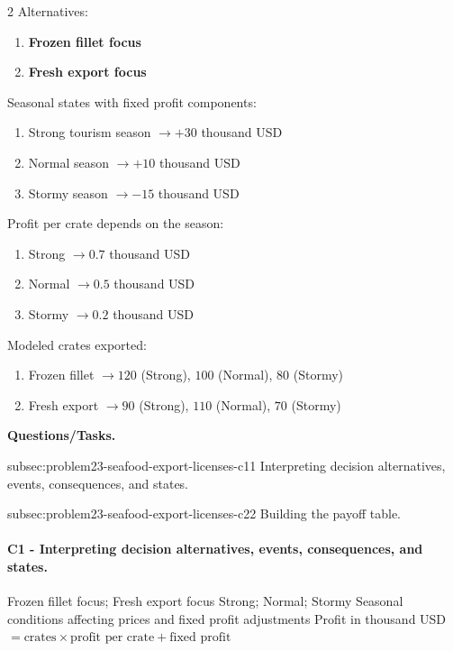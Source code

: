 	\begin{multicols}{2}
		Alternatives:
		\begin{enumerate}[label=\arabic*.]
			\item \textbf{Frozen fillet focus}
			\item \textbf{Fresh export focus}
		\end{enumerate}

		Seasonal states with fixed profit components:
		\begin{enumerate}[label=\arabic*.]
			\item Strong tourism season $\to +30$ thousand USD
			\item Normal season $\to +10$ thousand USD
			\item Stormy season $\to -15$ thousand USD
		\end{enumerate}

			\columnbreak

		Profit per crate depends on the season:
		\begin{enumerate}[label=\arabic*.]
			\item Strong $\to 0.7$ thousand USD
			\item Normal $\to 0.5$ thousand USD
			\item Stormy $\to 0.2$ thousand USD
		\end{enumerate}

		Modeled crates exported:
		\begin{enumerate}[label=\arabic*.]
			\item Frozen fillet $\to 120$ (Strong), $100$ (Normal), $80$ (Stormy)
			\item Fresh export $\to 90$ (Strong), $110$ (Normal), $70$ (Stormy)
		\end{enumerate}
	\end{multicols}

	\textbf{Questions/Tasks.}
	\begin{enumerate}
		\CriterionTask
		{subsec:problem23-seafood-export-licenses-c1}{1}
		{Interpreting decision alternatives, events, consequences, and states.}

		\CriterionTask
		{subsec:problem23-seafood-export-licenses-c2}{2}
		{Building the payoff table.}
	\end{enumerate}

	\paragraph*{C1 - Interpreting decision alternatives, events, consequences, and states.}
	\label{subsec:problem23-seafood-export-licenses-c1}
	\DecisionElementsTable
	{Frozen fillet focus; Fresh export focus}
	{Strong; Normal; Stormy}
	{Seasonal conditions affecting prices and fixed profit adjustments}
	{Profit in thousand USD $= \text{crates} \times \text{profit per crate} + \text{fixed profit}$}

